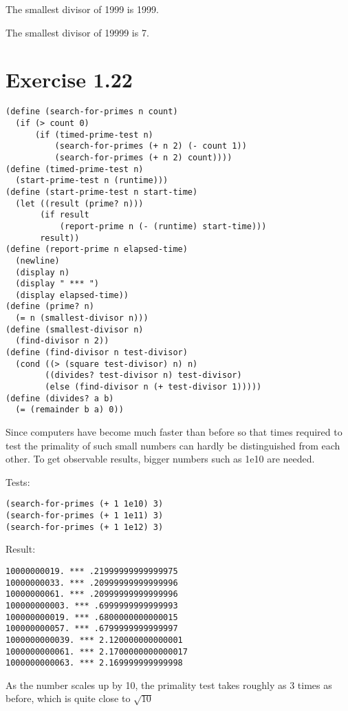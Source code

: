 \documentclass[../main.tex]{subfiles}
\begin{document}
The smallest divisor of 1999 is 1999.

The smallest divisor of 19999 is 7.

\section{Exercise 1.22}

\begin{lstlisting}
(define (search-for-primes n count)
  (if (> count 0)
      (if (timed-prime-test n)
          (search-for-primes (+ n 2) (- count 1))
          (search-for-primes (+ n 2) count))))
(define (timed-prime-test n)
  (start-prime-test n (runtime)))
(define (start-prime-test n start-time)
  (let ((result (prime? n)))
       (if result
           (report-prime n (- (runtime) start-time)))
       result))
(define (report-prime n elapsed-time)
  (newline)
  (display n)
  (display " *** ")
  (display elapsed-time))
(define (prime? n)
  (= n (smallest-divisor n)))
(define (smallest-divisor n)
  (find-divisor n 2))
(define (find-divisor n test-divisor)
  (cond ((> (square test-divisor) n) n)
        ((divides? test-divisor n) test-divisor)
        (else (find-divisor n (+ test-divisor 1)))))
(define (divides? a b)
  (= (remainder b a) 0))
\end{lstlisting}

Since computers have become much faster than before so that
 times required to test the primality of such small numbers
 can hardly be distinguished from each other. To get observable
 results, bigger numbers such as 1e10 are needed.

Tests:

\begin{lstlisting}
(search-for-primes (+ 1 1e10) 3)
(search-for-primes (+ 1 1e11) 3)
(search-for-primes (+ 1 1e12) 3)
\end{lstlisting}

Result:

\begin{lstlisting}
10000000019. *** .21999999999999975
10000000033. *** .20999999999999996
10000000061. *** .20999999999999996
100000000003. *** .6999999999999993
100000000019. *** .6800000000000015
100000000057. *** .6799999999999997
1000000000039. *** 2.120000000000001
1000000000061. *** 2.1700000000000017
1000000000063. *** 2.169999999999998
\end{lstlisting}

As the number scales up by 10, the primality
 test takes roughly as 3 times as before, which is
 quite close to $\sqrt{10}$
\end{document}
